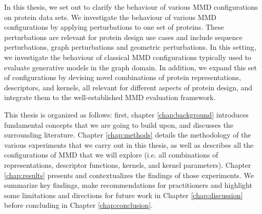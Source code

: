 In this thesis, we set out to clarify the behaviour of various MMD
configurations on protein data sets. We investigate the behaviour of various MMD
configurations by applying perturbations to one set of proteins. These
perturbations are relevant for protein design use cases and include sequence
perturbations, graph perturbations and geometric perturbations. In this setting,
we investigate the behaviour of classical MMD configurations typically used to
evaluate generative models in the graph domain. In addition, we expand this set
of configurations by devising novel combinations of protein representations,
descriptors, and kernels, all relevant for different aspects of protein design,
and integrate them to the well-established MMD evaluation framework.

This thesis is organized as follows: first, chapter \ref{chap:background}
introduces fundamental concepts that we are going to build upon, and discusses
the surrounding literature. Chapter \ref{chap:methods} details the methodology
of the various experiments that we carry out in this thesis, as well as
describes all the configurations of MMD that we will explore (i.e. all
combinations of representations, descriptor functions, kernels, and kernel
parameters). Chapter \ref{chap:results} presents and contextualizes the findings of those
experiments. We summarize key findings, make recommendations for practitioners and
highlight some limitations and directions for future work in Chapter
\ref{chap:discussion} before concluding in Chapter \ref{chap:conclusion}.





